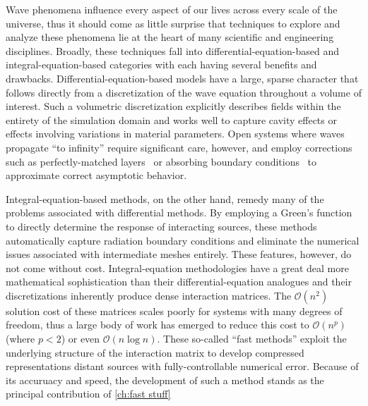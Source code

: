 Wave phenomena influence every aspect of our lives across every scale of the universe, thus it should come as little surprise that techniques to explore and analyze these phenomena lie at the heart of many scientific and engineering disciplines.
Broadly, these techniques fall into differential-equation-based and integral-equation-based categories with each having several benefits and drawbacks.
Differential-equation-based models have a large, sparse character that follows directly from a discretization of the wave equation throughout a volume of interest.
Such a volumetric discretization explicitly describes fields within the entirety of the simulation domain and works well to capture cavity effects or effects involving variations in material parameters.
Open systems where waves propagate ``to infinity'' require significant care, however, and employ corrections such as perfectly-matched layers~\cite{Berenger1994} or absorbing boundary conditions~\cite{Mur1981} to approximate correct asymptotic behavior.

Integral-equation-based methods, on the other hand, remedy many of the problems associated with differential methods.
By employing a Green's function to directly determine the response of interacting sources, these methods automatically capture radiation boundary conditions and eliminate the numerical issues associated with intermediate meshes entirely.
These features, however, do not come without cost.
Integral-equation methodologies have a great deal more mathematical sophistication than their differential-equation analogues and their discretizations inherently produce dense interaction matrices.
The $\mathcal{O}(n^2)$ solution cost of these matrices scales poorly for systems with many degrees of freedom, thus a large body of work has emerged to reduce this cost to $\mathcal{O}(n^p)$ (where $p < 2$) or even $\mathcal{O}(n \log n)$.
These so-called ``fast methods'' exploit the underlying structure of the interaction matrix to develop compressed representations distant sources with fully-controllable numerical error.
Because of its accuruacy and speed, the development of such a method stands as the principal contribution of \cref{ch:fast stuff}
